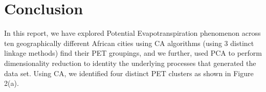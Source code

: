 \documentclass[12pt,a4paper]{article}
\begin{document}
\section{Conclusion}
In this report,  we have explored Potential Evapotranspiration phenomenon across ten geographically different African cities using CA algorithms (using 3 distinct linkage methods) find their PET groupings, and we further,  used PCA to perform dimensionality reduction to identity the underlying processes that generated the data set.   
Using CA,  we identified four distinct PET clusters as shown in  Figure 2(a).
\end{document}
